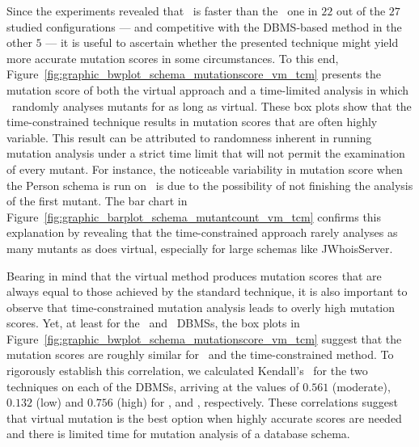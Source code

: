 


 Since the experiments revealed that \vma~is faster than the \Original~one in $22$ out of the $27$ studied configurations --- and competitive with the DBMS-based method in the other $5$ --- it is useful to ascertain whether the presented technique might yield more accurate mutation scores in some circumstances. To this end, Figure~\ref{fig:graphic_bwplot_schema_mutationscore_vm_tcm} presents the mutation score of both the virtual approach and a time-limited analysis in which \Original~randomly analyses mutants for as long as virtual. These box plots show that the time-constrained technique results in mutation scores that are often highly variable. This result can be attributed to randomness inherent in running mutation analysis under a strict time limit that will not permit the examination of every mutant. 
%
For instance, the noticeable variability in \mbox{mutation} score when the Person schema is run on \Postgres~is due to the possibility of not finishing the analysis of the first mutant. The bar chart in Figure~\ref{fig:graphic_barplot_schema_mutantcount_vm_tcm} confirms this explanation by revealing that the time-constrained approach rarely analyses as many mutants as does virtual, especially for large schemas like JWhoisServer.

Bearing in mind that the virtual method produces mutation scores that are always equal to those achieved by the standard technique, it is also important to observe that time-constrained mutation analysis leads to overly high mutation scores.  Yet, at least for the \HyperSQL~and \SQLite~DBMSs, the box plots in Figure~\ref{fig:graphic_bwplot_schema_mutationscore_vm_tcm} suggest that the mutation scores are roughly similar for \vma~and the time-constrained method. To rigorously establish this correlation, we calculated Kendall's \taub~for the two techniques on each of the DBMSs, arriving at the values of $0.561$ (moderate), $0.132$ (low) and $0.756$ (high) for \HyperSQL, \PostgreSQL and \sqlite, respectively. These correlations suggest that virtual mutation is the best option when highly accurate scores are needed and there is limited time for mutation analysis of a database schema.

